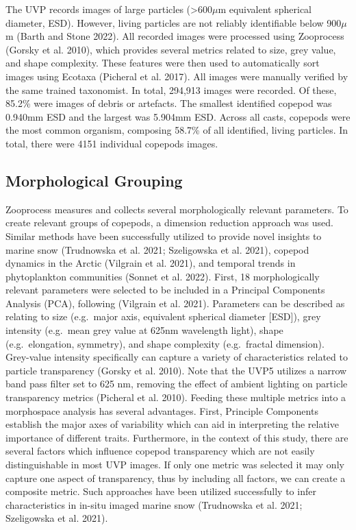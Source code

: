 \documentclass[
]{article}
\begin{document}
The UVP records images of large particles (\textgreater600\(\mu\)m
equivalent spherical diameter, ESD). However, living particles are not
reliably identifiable below 900\(\mu\)m (Barth and Stone 2022). All
recorded images were processed using Zooprocess (Gorsky et al. 2010),
which provides several metrics related to size, grey value, and shape
complexity. These features were then used to automatically sort images
using Ecotaxa (Picheral et al. 2017). All images were manually verified
by the same trained taxonomist. In total, 294,913 images were recorded.
Of these, 85.2\% were images of debris or artefacts. The smallest
identified copepod was 0.940mm ESD and the largest was 5.904mm ESD.
Across all casts, copepods were the most common organism, composing
58.7\% of all identified, living particles. In total, there were 4151
individual copepods images.

\hypertarget{morphological-grouping}{%
\subsection{Morphological Grouping}\label{morphological-grouping}}

Zooprocess measures and collects several morphologically relevant
parameters. To create relevant groups of copepods, a dimension reduction
approach was used. Similar methods have been successfully utilized to
provide novel insights to marine snow (Trudnowska et al. 2021;
Szeligowska et al. 2021), copepod dynamics in the Arctic (Vilgrain et
al. 2021), and temporal trends in phytoplankton communities (Sonnet et
al. 2022). First, 18 morphologically relevant parameters were selected
to be included in a Principal Components Analysis (PCA), following
(Vilgrain et al. 2021). Parameters can be described as relating to size
(e.g.~major axis, equivalent spherical diameter {[}ESD{]}), grey
intensity (e.g.~mean grey value at 625nm wavelength light), shape
(e.g.~elongation, symmetry), and shape complexity (e.g.~fractal
dimension). Grey-value intensity specifically can capture a variety of
characteristics related to particle transparency (Gorsky et al. 2010).
Note that the UVP5 utilizes a narrow band pass filter set to 625 nm,
removing the effect of ambient lighting on particle transparency metrics
(Picheral et al. 2010). Feeding these multiple metrics into a
morphospace analysis has several advantages. First, Principle Components
establish the major axes of variability which can aid in interpreting
the relative importance of different traits. Furthermore, in the context
of this study, there are several factors which influence copepod
transparency which are not easily distinguishable in most UVP images. If
only one metric was selected it may only capture one aspect of
transparency, thus by including all factors, we can create a composite
metric. Such approaches have been utilized successfully to infer
characteristics in in-situ imaged marine snow (Trudnowska et al. 2021;
Szeligowska et al. 2021).
\end{document}
